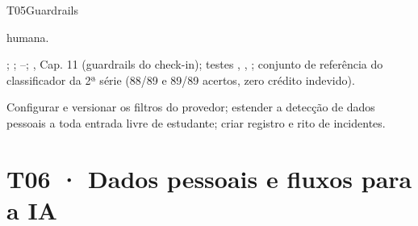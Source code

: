 \begin{resposta}{T05}{Guardrails}{\parcial}
\begin{campos}
    humana.
  \item[Evidência] ;
    ;
    --; , Cap. 11 (guardrails do
    check-in); testes ,
    , ; conjunto
    de referência do classificador da 2ª série (88/89 e 89/89 acertos, zero
    crédito indevido).
  \item[Lacuna] Configurar e versionar os filtros do provedor; estender a
    detecção de dados pessoais a toda entrada livre de estudante; criar
    registro e rito de incidentes.
\end{campos}
\end{resposta}

\section{T06 · Dados pessoais e fluxos para a IA}
\label{sec:t06}

